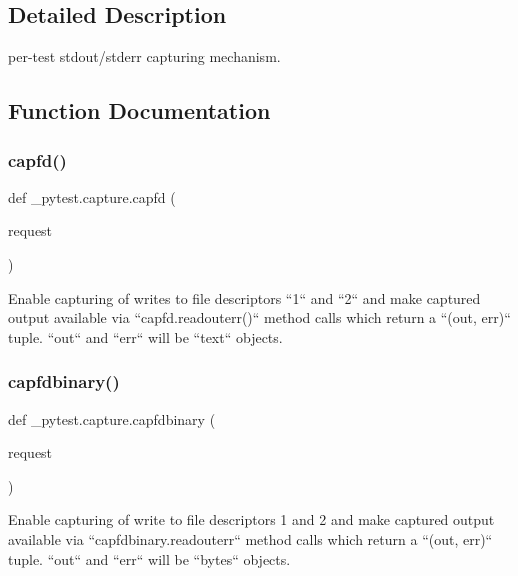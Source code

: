 \subsection{Detailed Description}
\begin{DoxyVerb}per-test stdout/stderr capturing mechanism.\end{DoxyVerb}
 

\subsection{Function Documentation}
\mbox{\label{namespace__pytest_1_1capture_a071b8199e1357caed85740df9b2fb1f6}} 
\subsubsection{\texorpdfstring{capfd()}{capfd()}}
{\footnotesize\ttfamily def \+\_\+pytest.\+capture.\+capfd (\begin{DoxyParamCaption}\item[{}]{request }\end{DoxyParamCaption})}

\begin{DoxyVerb}Enable capturing of writes to file descriptors ``1`` and ``2`` and make
captured output available via ``capfd.readouterr()`` method calls
which return a ``(out, err)`` tuple.  ``out`` and ``err`` will be ``text``
objects.
\end{DoxyVerb}
 \mbox{\label{namespace__pytest_1_1capture_a59bfc1c8065be6fcee0965d2587bd346}} 
\subsubsection{\texorpdfstring{capfdbinary()}{capfdbinary()}}
{\footnotesize\ttfamily def \+\_\+pytest.\+capture.\+capfdbinary (\begin{DoxyParamCaption}\item[{}]{request }\end{DoxyParamCaption})}

\begin{DoxyVerb}Enable capturing of write to file descriptors 1 and 2 and make
captured output available via ``capfdbinary.readouterr`` method calls
which return a ``(out, err)`` tuple.  ``out`` and ``err`` will be
``bytes`` objects.
\end{DoxyVerb}
 \mbox{\label{namespace__pytest_1_1capture_a0c9a4fc3173a5ab87c7066f3911666e8}} 
